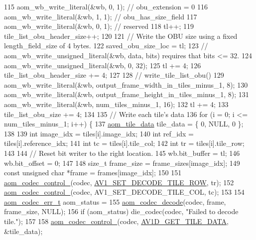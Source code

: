 \begin{DoxyCodeInclude}
{115   aom\_wb\_write\_literal(&wb, 0, 1);  \textcolor{comment}{// obu\_extension = 0}
116   aom\_wb\_write\_literal(&wb, 1, 1);  \textcolor{comment}{// obu\_has\_size\_field}
117   aom\_wb\_write\_literal(&wb, 0, 1);  \textcolor{comment}{// reserved}
118   tl++;
119   tile\_list\_obu\_header\_size++;
120 
121   \textcolor{comment}{// Write the OBU size using a fixed length\_field\_size of 4 bytes.}
122   saved\_obu\_size\_loc = tl;
123   \textcolor{comment}{// aom\_wb\_write\_unsigned\_literal(&wb, data, bits) requires that bits <= 32.}
124   aom\_wb\_write\_unsigned\_literal(&wb, 0, 32);
125   tl += 4;
126   tile\_list\_obu\_header\_size += 4;
127 
128   \textcolor{comment}{// write\_tile\_list\_obu()}
129   aom\_wb\_write\_literal(&wb, output\_frame\_width\_in\_tiles\_minus\_1, 8);
130   aom\_wb\_write\_literal(&wb, output\_frame\_height\_in\_tiles\_minus\_1, 8);
131   aom\_wb\_write\_literal(&wb, num\_tiles\_minus\_1, 16);
132   tl += 4;
133   tile\_list\_obu\_size += 4;
134 
135   \textcolor{comment}{// Write each tile's data}
136   \textcolor{keywordflow}{for} (i = 0; i <= num\_tiles\_minus\_1; i++) \{
137     \hyperlink{structaom__tile__data}{aom\_tile\_data} tile\_data = \{ 0, NULL, 0 \};
138 
139     \textcolor{keywordtype}{int} image\_idx = tiles[i].image\_idx;
140     \textcolor{keywordtype}{int} ref\_idx = tiles[i].reference\_idx;
141     \textcolor{keywordtype}{int} tc = tiles[i].tile\_col;
142     \textcolor{keywordtype}{int} tr = tiles[i].tile\_row;
143 
144     \textcolor{comment}{// Reset bit writer to the right location.}
145     wb.bit\_buffer = tl;
146     wb.bit\_offset = 0;
147 
148     \textcolor{keywordtype}{size\_t} frame\_size = frame\_sizes[image\_idx];
149     \textcolor{keyword}{const} \textcolor{keywordtype}{unsigned} \textcolor{keywordtype}{char} *frame = frames[image\_idx];
150 
151     \hyperlink{group__codec_ga51eb332a40dcacc39000ab8e0be36b79}{aom\_codec\_control\_}(codec, \hyperlink{group__aom__decoder_gga3865fd4b3192489baa9a5c3632ebe97bac056b4cf80427fd05e3c4c9fc46edb78}{AV1\_SET\_DECODE\_TILE\_ROW}, tr);
152     \hyperlink{group__codec_ga51eb332a40dcacc39000ab8e0be36b79}{aom\_codec\_control\_}(codec, AV1\_SET\_DECODE\_TILE\_COL, tc);
153 
154     \hyperlink{group__codec_gaaae61e0f8663e6137f1e228757248e7c}{aom\_codec\_err\_t} aom\_status =
155         \hyperlink{group__decoder_gab03fdb999d1f83a5896869a3ba5f68f7}{aom\_codec\_decode}(codec, frame, frame\_size, NULL);
156     \textcolor{keywordflow}{if} (aom\_status) die\_codec(codec, \textcolor{stringliteral}{"Failed to decode tile."});
157 
158     \hyperlink{group__codec_ga51eb332a40dcacc39000ab8e0be36b79}{aom\_codec\_control\_}(codec, \hyperlink{group__aom__decoder_gga3865fd4b3192489baa9a5c3632ebe97badf1e96275f692bc97ddb4ce2fbdb456e}{AV1D\_GET\_TILE\_DATA}, &tile\_data);
}
\end{DoxyCodeInclude}
